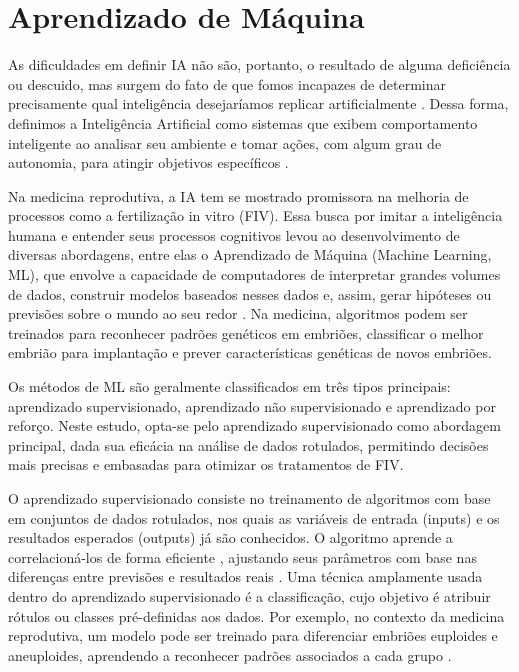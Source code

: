 \section{Aprendizado de Máquina}

As dificuldades em definir IA não são, portanto, o resultado de alguma deficiência ou descuido, mas surgem do fato de que fomos incapazes de determinar precisamente qual inteligência desejaríamos replicar artificialmente \cite{sheikh2023}. Dessa forma, definimos a Inteligência Artificial como sistemas que exibem comportamento inteligente ao analisar seu ambiente e tomar ações, com algum grau de autonomia, para atingir objetivos específicos \cite{sheikh2023}. 

Na medicina reprodutiva, a IA tem se mostrado promissora na melhoria de processos como a fertilização in vitro (FIV). Essa busca por imitar a inteligência humana e entender seus processos cognitivos levou ao desenvolvimento de diversas abordagens, entre elas o Aprendizado de Máquina (Machine Learning, ML), que envolve a capacidade de computadores de interpretar grandes volumes de dados, construir modelos baseados nesses dados e, assim, gerar hipóteses ou previsões sobre o mundo ao seu redor \cite{russell2016}. Na medicina, algoritmos podem ser treinados para reconhecer padrões genéticos em embriões, classificar o melhor embrião para implantação e prever características genéticas de novos embriões. 

Os métodos de ML são geralmente classificados em três tipos principais: aprendizado supervisionado, aprendizado não supervisionado e aprendizado por reforço. Neste estudo, opta-se pelo aprendizado supervisionado como abordagem principal, dada sua eficácia na análise de dados rotulados, permitindo decisões mais precisas e embasadas para otimizar os tratamentos de FIV.

O aprendizado supervisionado consiste no treinamento de algoritmos com base em conjuntos de dados rotulados, nos quais as variáveis de entrada (inputs) e os resultados esperados (outputs) já são conhecidos. O algoritmo aprende a correlacioná-los de forma eficiente \cite{russell2016}, ajustando seus parâmetros com base nas diferenças entre previsões e resultados reais \cite{trask2019}. Uma técnica amplamente usada dentro do aprendizado supervisionado é a classificação, cujo objetivo é atribuir rótulos ou classes pré-definidas aos dados. Por exemplo, no contexto da medicina reprodutiva, um modelo pode ser treinado para diferenciar embriões euploides e aneuploides, aprendendo a reconhecer padrões associados a cada grupo \cite{izbicki2020}.

